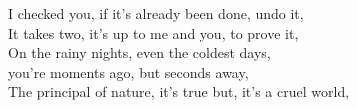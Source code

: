 I checked you, if it's already been done, undo it, \\
It takes two, it's up to me and you, to prove it, \\
On the rainy nights, even the coldest days, \\
you're moments ago, but seconds away, \\
The principal of nature, it's true but, it's a cruel world,